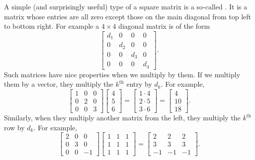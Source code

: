 \documentclass{ximera}
\begin{document}
A simple (and surprisingly useful) type of a square matrix is a so-called \emph{}.  It is a matrix whose entries are all zero except those on the main diagonal from top left to bottom right.  For example a $4 \times 4$ diagonal matrix is of the form
\begin{equation*}
    \begin{bmatrix}
        d_1 & 0 & 0 & 0 \\
        0 & d_2 & 0 & 0 \\
        0 & 0 & d_3 & 0 \\
        0 & 0 & 0 & d_4
    \end{bmatrix} .
\end{equation*}
Such matrices have nice properties when we multiply by them.  If we multiply them by a vector, they multiply the $k^{\text{th}}$ entry by $d_k$.  For example,
\begin{equation*}
    \begin{bmatrix}
        1 & 0 & 0 \\
        0 & 2 & 0 \\
        0 & 0 & 3
    \end{bmatrix}
    \begin{bmatrix}
        4 \\ 
        5 \\ 
        6
    \end{bmatrix}
    =
    \begin{bmatrix}
        1 \cdot 4 \\ 
        2 \cdot 5 \\ 
        3 \cdot 6
    \end{bmatrix}
    =
    \begin{bmatrix}
        4 \\ 
        10 \\ 
        18
    \end{bmatrix} .
\end{equation*}
Similarly, when they multiply another matrix from the left, they multiply the $k^{\text{th}}$ row by $d_k$.  For example,
\begin{equation*}
    \begin{bmatrix}
        2 & 0 & 0 \\
        0 & 3 & 0 \\
        0 & 0 & -1
    \end{bmatrix}
    \begin{bmatrix}
        1 & 1 & 1 \\
        1 & 1 & 1 \\
        1 & 1 & 1 
    \end{bmatrix}
    =
    \begin{bmatrix}
        2 & 2 & 2 \\
        3 & 3 & 3 \\
        -1 & -1 & -1 
    \end{bmatrix} .
\end{equation*}
\end{document}
